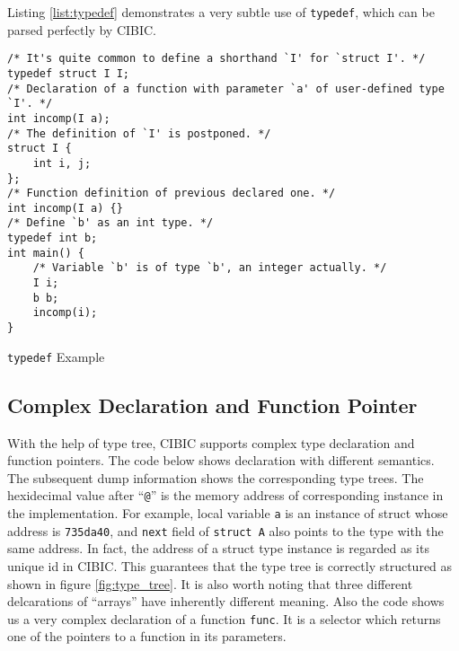 \documentclass[10pt, a4paper]{article}
\begin{document}
Listing \ref{list:typedef} demonstrates a very subtle use of \texttt{typedef},
which can be parsed perfectly by CIBIC.

\begin{listing}[H]
    \centering
    \begin{verbatim}
/* It's quite common to define a shorthand `I' for `struct I'. */
typedef struct I I;
/* Declaration of a function with parameter `a' of user-defined type `I'. */
int incomp(I a);
/* The definition of `I' is postponed. */
struct I {
    int i, j;
};
/* Function definition of previous declared one. */
int incomp(I a) {}
/* Define `b' as an int type. */
typedef int b;
int main() {
    /* Variable `b' is of type `b', an integer actually. */
    I i;
    b b;
    incomp(i);
}
\end{verbatim}
\caption {\texttt{typedef} Example}
\label {list:typedef}
\end{listing}
\newpage
\subsection{Complex Declaration and Function Pointer}
With the help of type tree, CIBIC supports complex type declaration and
function pointers. The code below shows declaration with different semantics.
The subsequent dump information shows the corresponding type trees. The
hexidecimal value after ``\texttt{@}'' is the memory address of corresponding
instance in the implementation. For example, local variable \texttt{a} is an
instance of struct whose address is \texttt{735da40}, and \texttt{next} field
of \texttt{struct A} also points to the type with the same address. In fact,
the address of a struct type instance is regarded as its unique id in CIBIC.
This guarantees that the type tree is correctly structured as shown in figure
\ref{fig:type_tree}. It is also worth noting that three different delcarations
of ``arrays'' have inherently different meaning. Also the code shows us a very
complex declaration of a function \texttt{func}. It is a selector which returns
one of the pointers to a function in its parameters.
\end{document}

